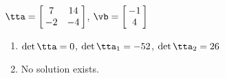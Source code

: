 {$\tta = \left[\hskip -3pt \begin{array}{cc} 7&14\\  -2&-4\end {array} \hskip -3pt
 \right] $,
 \quad
$\vb = \left[\hskip -3pt \begin{array}{c} -1\\  4\end{array}\hskip -3pt \right]$}
{\begin{enumerate}
\item	$\det{\tta} = 0$, $\det{\tta_1} = -52$, $\det{\tta_2} = 26$
\item No solution exists.
\end{enumerate}
}
 


 

